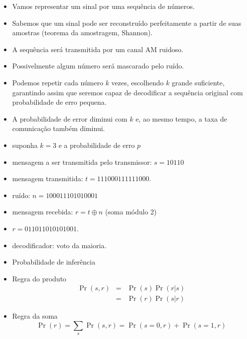 \begin{frame}[allowframebreaks]
  \begin{example}\label{ex:codrep} 
	\begin{itemize}
	\item Vamos representar um sinal por uma sequência de números.
	\item Sabemos que um sinal pode ser reconstruído perfeitamente a partir de suas amostras (teorema da amostragem, Shannon).
	\item A sequência será transmitida por um canal AM ruidoso.
	\item Possivelmente algum número será mascarado pelo ruído.
	\item Podemos repetir cada número $k$ vezes, escolhendo $k$ grande suficiente, garantindo assim que seremos capaz
	de decodificar a sequência original com probabilidade de erro pequena.
	\item A probabilidade de error diminui com $k$ e, ao mesmo tempo, a taxa de comunicação também diminui. 
	\end{itemize}

  \examplebreak
	\begin{itemize}
	\item suponha $k=3$ e a probabilidade de erro $p$
	\item mensagem a ser transmitida pelo transmissor: $s = 10110$
	\item mensagem transmitida: $t = 111 000 111 111 000$.
	\item ruído:                $n = 100 011 101 010 001$
	\item mensagem recebida: $r = t \oplus n$ (soma módulo 2)
	\item $r = 011 011 010 101 001$.
	\item decodificador: voto da maioria.
	\end{itemize}
 
  \examplebreak
	\begin{itemize}
        \item Probabilidade de inferência
	\item Regra do produto
		\begin{eqnarray}
		\Pr(s,r) &=& \Pr(s) \Pr(r|s) \nonumber \\
			&=& \Pr(r) \Pr(s|r)
		\end{eqnarray} 
	\item Regra da soma
		\begin{equation}
		\Pr(r) = \sum_s \Pr(s,r) = \Pr(s=0,r) + \Pr(s=1,r)
		\end{equation}
	\end{itemize}


\end{example}
\end{frame}
